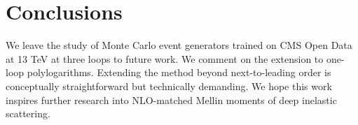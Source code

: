 \section{Conclusions}\label{sec:conclusions}

We leave the study of Monte Carlo event generators trained on CMS Open
Data at 13 TeV at three loops to future work. We comment on the
extension to one-loop polylogarithms. Extending the method beyond
next-to-leading order is conceptually straightforward but technically
demanding. We hope this work inspires further research into NLO-matched
Mellin moments of deep inelastic scattering.

